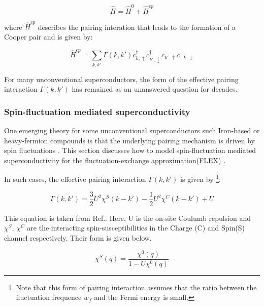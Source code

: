 \documentclass[12pt]{article}
\begin{document}
\begin{equation}\label{General Hamiltonian}
    \hat{H} = \hat{H}^0 + \hat{H}^{cp}
\end{equation}

\noindent where $\hat{H}^{cp}$ describes the pairing interation that leads to the formation of a Cooper pair and is given by:

\begin{equation}\label{Hcp}
    \hat{H}^{cp} = \sum_{k,k'} \Gamma(k, k') c^{\dagger}_{k, \uparrow}  c^{\dagger}_{k', \downarrow} c_{k', \uparrow}c_{-k, \downarrow}
\end{equation}

\noindent For many unconventional superconductors, the form of the effective pairing interaction $\Gamma(k,k')$ has remained as an unanswered question for decades.

\subsubsection{Spin-fluctuation mediated superconductivity}

One emerging theory for some unconventional superconductors such Iron-based or heavy-fermion compounds 
is that the underlying pairing mechanism is driven by spin fluctuations \cite{moriya2000spin}. This section discusses how to
model spin-fluctuation mediated superconductivity for the fluctuation-exchange approximation(FLEX) \cite{esirgen1997fluctuation}. \par
\medskip
\noindent In such cases, the effective pairing interaction $\Gamma(k,k')$ is given by \footnote{Note that this form of pairing interaction 
assumes that the ratio between 
the fluctuation frequence $w_f$ and the Fermi energy is small.}:

\begin{equation}\label{Pairing interaction SF}
    \Gamma(k,k') = \frac{3}{2} U^2 \chi^S(k-k') -\frac{1}{2}U^2 \chi^C(k-k') + U
\end{equation} 

\noindent This equation is taken from Ref.\cite{migdal1958interaction}. Here, U is the on-site Coulumb repulsion and $\chi^S$, $\chi^C$ are the interacting spin-susceptibilities in the Charge (C) and Spin(S) channel respectively. Their form is given below.

\begin{equation}
    \chi^S(q) = \frac{\chi^0(q)}{1 - U \chi^0 (q)}
\end{equation}
\end{document}
